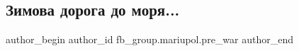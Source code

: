  
 
 
 
 

\subsection{Зимова дорога до моря...}
\label{sec:05_02_2023.fb.fb_group.mariupol.pre_war.2.zimova_doroga_do_mor}

\ifcmt
 author_begin
   author_id fb_group.mariupol.pre_war
 author_end
\fi
